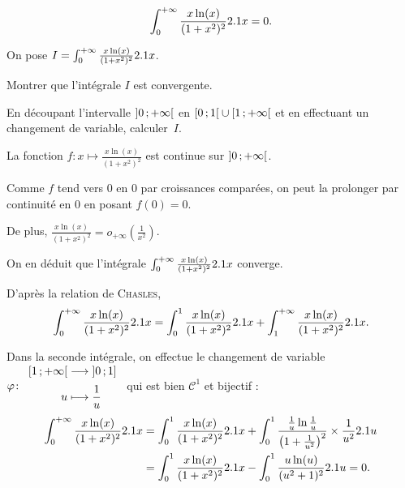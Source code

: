 \begin{prop}
\[
\int_0^{+\infty} \frac{x \ln(x)}{(1 + x^2)^2} 2.1 x
= 0.
\]
\end{prop}

\begin{exercice}
On pose $I = \int_0^{+\infty} \frac{x \ln(x)}{(1 + x^2)^2} 2.1 x$.
\begin{questions}
\item Montrer que l'intégrale $I$ est convergente.

\item En découpant l'intervalle $\left]0\,;+\infty\right[$ en $\left[0\,;1\right[ \cup \left[1\,;+\infty\right[$ et en effectuant un changement de variable, calculer~$I$.
\end{questions}
\end{exercice}

\begin{elemsolution}
\begin{reponses}
\item La fonction $f \colon x \mapsto \frac{x \ln(x)}{(1 + x^2)^2}$ est continue sur $\left]0\,;+\infty\right[$.

Comme $f$ tend vers $0$ en $0$ par croissances comparées, on peut la prolonger par continuité en $0$ en posant $f(0) = 0$.

De plus, $\frac{x \ln(x)}{(1+x^2)^2} = o_{+\infty}\mathopen{}\left( \frac{1}{x^2} \right)$.

On en déduit que l'intégrale $\int_0^{+\infty} \frac{x \ln(x)}{(1 + x^2)^2} 2.1 x$ converge.

\item D'après la relation de \textsc{Chasles},
\[
\int_0^{+\infty} \frac{x \ln(x)}{(1 + x^2)^2} 2.1 x
= \int_0^1 \frac{x \ln(x)}{(1 + x^2)^2} 2.1 x + \int_1^{+\infty} \frac{x \ln(x)}{(1 + x^2)^2} 2.1 x.
\]

Dans la seconde intégrale, on effectue le changement de variable $\fonction[\varphi]{\interfo{1}{+\infty}}{\interof{0}{1}}{u}{\frac{1}{u}}$ qui est bien $\mathscr{C}^1$ et bijectif :
\begin{align*}
\int_0^{+\infty} \frac{x \ln(x)}{(1 + x^2)^2} 2.1 x
&= \int_0^1 \frac{x \ln(x)}{(1 + x^2)^2} 2.1 x + \int_0^1 \frac{\frac{1}{u} \ln \frac{1}{u}}{\big(1 + \frac{1}{u^2}\big)^2} \times \frac{1}{u^2} 2.1 u\\
&= \int_0^1 \frac{x \ln(x)}{(1 + x^2)^2} 2.1 x - \int_0^1 \frac{u \ln(u)}{(u^2 + 1)^2} 2.1 u
= 0.
\end{align*}
\end{reponses}
\end{elemsolution}